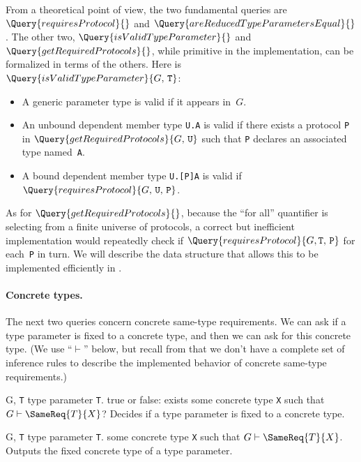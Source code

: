 \documentclass[../generics]{subfiles}
\begin{document}
From a theoretical point of view, the two fundamental queries are $\Query{requiresProtocol}{}$ and $\Query{areReducedTypeParametersEqual}{}$. The other two, $\Query{isValidTypeParameter}{}$ and $\Query{getRequiredProtocols}{}$, while primitive in the implementation, can be formalized in terms of the others. Here is $\Query{isValidTypeParameter}{G,\,\texttt{T}}$:
\begin{itemize}
\item A generic parameter type is valid if it appears in~$G$.
\item An unbound dependent member type \texttt{U.A} is valid if there exists a protocol \texttt{P} in $\Query{getRequiredProtocols}{G,\,\texttt{U}}$
such that \texttt{P} declares an associated type named~\texttt{A}.
\item A bound dependent member type \texttt{U.[P]A} is valid if $\Query{requiresProtocol}{G,\,\texttt{U},\,\texttt{P}}$.
\end{itemize}
As for $\Query{getRequiredProtocols}{}$, because the ``for all'' quantifier is selecting from a finite universe of protocols, a correct but inefficient implementation would repeatedly check if $\Query{requiresProtocol}{G,\texttt{T},\,\texttt{P}}$ for each~\texttt{P} in turn. We will describe the data structure that allows this to be implemented efficiently in .

\paragraph{Concrete types.} The next two queries concern concrete same-type requirements. We can ask if a type parameter is fixed to a concrete type, and then we can ask for this concrete type. (We use ``$\vdash$'' below, but recall from  that we don't have a complete set of inference rules to describe the implemented behavior of concrete same-type requirements.)

\begin{itemize}
{G, \texttt{T}}
{type parameter \texttt{T}.}
{true or false: exists some concrete type \texttt{X} such that $G\vdash\SameReq{T}{X}$?}
{Decides if a type parameter is fixed to a concrete type.}

{G, \texttt{T}}
{type parameter \texttt{T}.}
{some concrete type \texttt{X} such that $G\vdash\SameReq{T}{X}$.}
{Outputs the fixed concrete type of a type parameter.}
\end{itemize}
\end{document}
